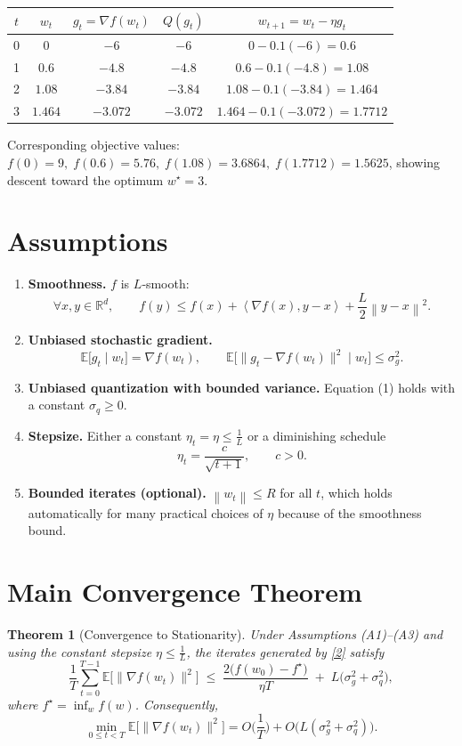 \documentclass{article}
\newtheorem{theorem}{Theorem}
\newcommand{\E}{\mathbb{E}}
\newcommand{\norm}[1]{\left\|#1\right\|}
\newcommand{\ip}[2]{\left\langle #1,#2\right\rangle}
\begin{document}
\begin{center}
\begin{tabular}{c|c|c|c|c}
$t$ & $w_t$ & $g_t= \nabla f(w_t)$ & $Q(g_t)$ & $w_{t+1}=w_t-\eta g_t$ \\ \hline
0 & $0$ & $-6$ & $-6$ & $0-0.1(-6)=0.6$ \\
1 & $0.6$ & $-4.8$ & $-4.8$ & $0.6-0.1(-4.8)=1.08$ \\
2 & $1.08$ & $-3.84$ & $-3.84$ & $1.08-0.1(-3.84)=1.464$ \\
3 & $1.464$ & $-3.072$ & $-3.072$ & $1.464-0.1(-3.072)=1.7712$
\end{tabular}
\end{center}
Corresponding objective values:
$f(0)=9,\; f(0.6)=5.76,\; f(1.08)=3.6864,\; f(1.7712)=1.5625$,
showing descent toward the optimum $w^\star=3$.

\newpage
\section*{Assumptions}
\begin{enumerate}
\item \textbf{Smoothness.} $f$ is $L$‑smooth:
\[
\forall x,y\in\mathbb{R}^d,\qquad 
f(y)\le f(x)+\ip{\nabla f(x)}{y-x}+\frac{L}{2}\norm{y-x}^2.
\tag{A1}
\]
\item \textbf{Unbiased stochastic gradient.}
\[
\E\big[g_t\mid w_t\big]=\nabla f(w_t),\qquad
\E\big[\|g_t-\nabla f(w_t)\|^2\mid w_t\big]\le\sigma_g^2.
\tag{A2}
\]
\item \textbf{Unbiased quantization with bounded variance.} Equation (1) holds with a constant $\sigma_q\ge0$.
\item \textbf{Stepsize.} Either a constant $\eta_t=\eta\le \frac{1}{L}$ or a diminishing schedule
\[
\eta_t=\frac{c}{\sqrt{t+1}},\qquad c>0.
\tag{A3}
\]
\item \textbf{Bounded iterates (optional).} $\norm{w_t}\le R$ for all $t$, which holds automatically for many practical choices of $\eta$ because of the smoothness bound.
\end{enumerate}

\section*{Main Convergence Theorem}
\begin{theorem}[Convergence to Stationarity]\label{thm:main}
Under Assumptions (A1)–(A3) and using the constant stepsize $\eta\le\frac{1}{L}$,
the iterates generated by \eqref{2} satisfy
\[
\frac{1}{T}\sum_{t=0}^{T-1}\E\!\big[\|\nabla f(w_t)\|^2\big]
\;\le\;
\frac{2\big(f(w_0)-f^\star\big)}{\eta T}
\;+\;
L\big(\sigma_g^2+\sigma_q^2\big),
\tag{3}
\]
where $f^\star=\inf_{w}f(w)$. Consequently,
\[
\min_{0\le t<T}\E\!\big[\|\nabla f(w_t)\|^2\big]=O\!\Big(\frac{1}{T}\Big)+O\!\big(L(\sigma_g^2+\sigma_q^2)\big).
\]
\end{theorem}
\end{document}
